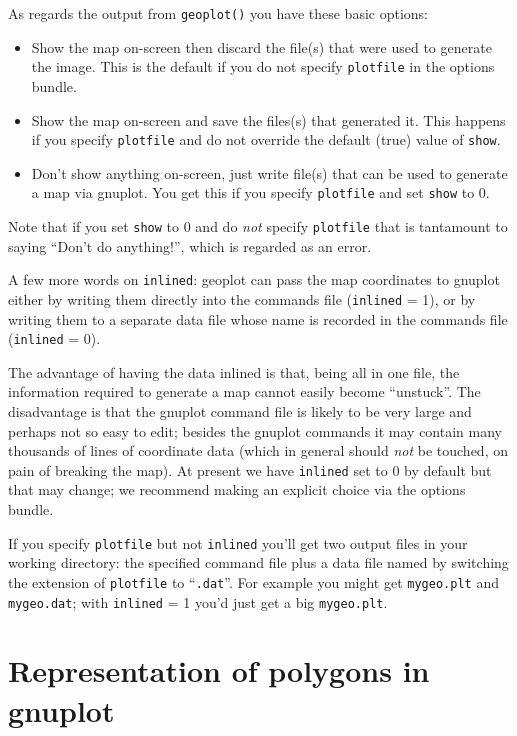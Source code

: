 \documentclass{article}
\begin{document}
As regards the output from \texttt{geoplot()} you have these basic
options:
\begin{itemize}
\item Show the map on-screen then discard the file(s) that were used
  to generate the image. This is the default if you do not specify
  \texttt{plotfile} in the options bundle.
\item Show the map on-screen and save the files(s) that generated it.
  This happens if you specify \texttt{plotfile} and do not override
  the default (true) value of \texttt{show}.
\item Don't show anything on-screen, just write file(s) that can be
  used to generate a map via gnuplot. You get this if you specify
  \texttt{plotfile} and set \texttt{show} to 0.
\end{itemize}

Note that if you set \texttt{show} to 0 and do \textit{not} specify
\texttt{plotfile} that is tantamount to saying ``Don't do anything!'',
which is regarded as an error.

A few more words on \texttt{inlined}: \textsf{geoplot} can pass the
map coordinates to gnuplot either by writing them directly into the
commands file (\texttt{inlined} = 1), or by writing them to a separate
data file whose name is recorded in the commands file
(\texttt{inlined} = 0).

The advantage of having the data inlined is that, being all in one
file, the information required to generate a map cannot easily become
``unstuck''. The disadvantage is that the gnuplot command file is
likely to be very large and perhaps not so easy to edit; besides the
gnuplot commands it may contain many thousands of lines of coordinate
data (which in general should \textit{not} be touched, on pain of
breaking the map). At present we have \texttt{inlined} set to 0 by
default but that may change; we recommend making an explicit choice
via the options bundle.

If you specify \texttt{plotfile} but not \texttt{inlined} you'll get
two output files in your working directory: the specified command file
plus a data file named by switching the extension of \texttt{plotfile}
to ``\texttt{.dat}''. For example you might get \texttt{mygeo.plt} and
\texttt{mygeo.dat}; with \texttt{inlined} = 1 you'd just get a big
\texttt{mygeo.plt}.


\clearpage
\appendix

\section{Representation of polygons in gnuplot}
\label{sec:gnuplot}
\end{document}

